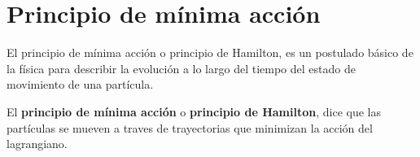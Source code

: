 \section{Principio de mínima acción}

El principio de mínima acción o principio de Hamilton, es un postulado básico de la física para describir la evolución a lo largo del tiempo del estado de movimiento de una partícula.

El \textbf{principio de mínima acción} o \textbf{principio de Hamilton}, dice que las partículas se mueven a traves de trayectorias que minimizan la acción del lagrangiano.
